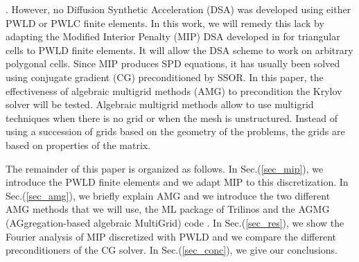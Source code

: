 \cite{pwl_diffusion}. However, no Diffusion Synthetic Acceleration (DSA) 
\cite{dsa_ref,larsen_dsa,consistent_p1,mip} was developed using either PWLD or
PWLC finite elements. In this work, we will remedy this lack by adapting the 
Modified Interior Penalty (MIP) DSA developed in \cite{mip} for triangular 
cells to PWLD finite elements. It will allow the DSA scheme to work on arbitrary 
polygonal cells. Since MIP produces SPD equations, it has usually 
been solved using conjugate gradient (CG) preconditioned by SSOR. In this
paper, the effectiveness of algebraic multigrid methods (AMG) to precondition 
the Krylov solver \cite{amg,amg_course} will be tested. Algebraic multigrid methods 
allow to use multigrid techniques when there is no grid or when the mesh is 
unstructured. Instead of using a succession of grids based on the geometry of the 
problems, the grids are based on properties of the matrix.

The remainder of this paper is organized as follows. In Sec.(\ref{sec_mip}),
we introduce the PWLD finite elements and we adapt MIP to this discretization. 
In Sec.(\ref{sec_amg}), we briefly explain AMG and we introduce the two different 
AMG methods that we will use, the ML package of Trilinos \cite{ml_guide} and the 
AGMG (AGgregation-based algebraic MultiGrid) code \cite{agmg_guide}. In 
Sec.(\ref{sec_res}), we show the Fourier analysis of MIP discretized with PWLD
and we compare the different preconditioners of the CG solver. In 
Sec.(\ref{sec_conc}), we give our conclusions.
